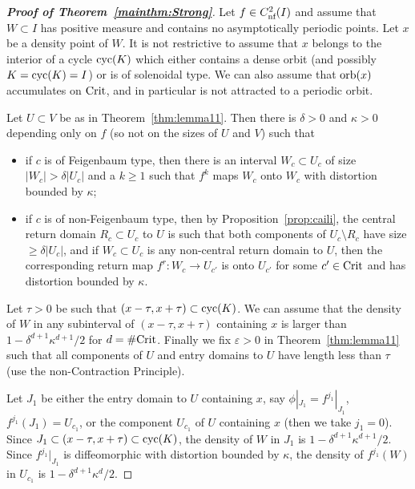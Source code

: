 \documentclass[12pt, psamsfonts, reqno]{amsart}
\begin{document}
\begin{proof}[\textbf{Proof of Theorem~\ref{mainthm:Strong}}]
Let $f\in {C^2_{\text{\rm nf}}}(I)$ and assume that $W \subset I$ has
positive measure and contains no asymptotically periodic points.
Let $x$ be a density point of $W$. It is
not restrictive to assume that $x$ belongs to the interior of a
cycle ${\mathop{\rm cyc}\nolimits}(K)$ which either contains a dense orbit (and possibly
$K = {\mathop{\rm cyc}\nolimits}(K) = I$) or is of solenoidal type. We can also assume
that ${\mathop{\rm orb}\nolimits}(x)$ accumulates on ${\mathop{\rm Crit}\nolimits}$, and in particular is not
attracted to a periodic orbit.

Let $U \subset V$ be as in Theorem~\ref{thm:lemma11}.
Then there is $\delta > 0$ and $\kappa > 0$ depending only on $f$ (so not on
the sizes of $U$ and $V$) such that
\begin{itemize}
\item if $c$ is of Feigenbaum type, then there is an interval $W_c \subset U_c$ of size $|W_c| > \delta |U_c|$ and a $k \geq 1$ such that $f^k$ maps $W_c$ onto $W_c$ with distortion bounded by $\kappa$;
\item if $c$ is of non-Feigenbaum type, then by Proposition~\ref{prop:caili},
the central return domain $R_c \subset U_c$ to $U$ is such that
both components of $U_c \setminus R_c$ have size $\geq \delta |U_c|$,
and if $W_c \subset U_c$ is any non-central return domain to $U$, then the
corresponding return map $f^r:W_c \to U_{c'}$ is onto $U_{c'}$ for
some $c' \in {\mathop{\rm Crit}\nolimits}$ and has distortion bounded by $\kappa$.
\end{itemize}
Let $\tau>0$ be such that $(x-\tau,x+\tau)\subset {\mathop{\rm cyc}\nolimits}(K)$. We can
assume that the density of $W$ in any subinterval of
$(x-\tau,x+\tau)$ containing $x$ is larger than
$1-\delta^{d+1}\kappa^{d+1}/2$ for $d=\#{\mathop{\rm Crit}\nolimits}$.
Finally we fix ${\varepsilon}>0$  in Theorem~\ref{thm:lemma11} such that
all components of $U$ and
entry domains to $U$ have length less than $\tau$ (use the non-Contraction
Principle).

Let $J_1$ be either the entry domain to $U$ containing $x$, say
$\phi|_{J_1}=f^{j_1}|_{J_1}$, $f^{j_1}(J_1)=U_{c_1}$, or the
component $U_{c_1}$ of $U$ containing $x$ (then we take $j_1=0$).
Since $J_1\subset (x-\tau,x+\tau)\subset {\mathop{\rm cyc}\nolimits}(K)$,
the density of $W$ in $J_1$ is $1-\delta^{d+1}\kappa^{d+1}/2$.
Since $f^{j_1}|_{J_1}$ is diffeomorphic with distortion bounded by $\kappa$,
the density of $f^{j_1}(W)$ in $U_{c_1}$ is $1-\delta^{d+1}\kappa^d/2$.


\end{proof}
\end{document}
